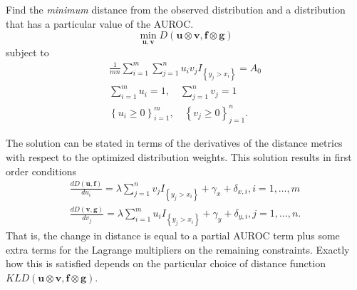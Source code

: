 
Find the \emph{minimum} distance from the observed distribution and a distribution that has a particular value of the AUROC.
%
\begin{equation}
    \min_{\mathbf{u}, \mathbf{v}}
        D(\mathbf{u} \otimes \mathbf{v}, \mathbf{f} \otimes \mathbf{g})
\end{equation}
%
\noindent subject to
%
\begin{align}
    \frac{1}{m n} \sum_{i = 1}^{m} \sum_{j = 1}^{n} u_i v_j I_{\left\{ y_j > x_i \right\}} = A_0 \\
    \sum_{i = 1}^{m} u_i = 1, \quad \sum_{j = 1}^{n} v_j = 1 \\
    \left\{ u_i  \geq 0 \right\}_{i=1}^{m}, \quad \left\{ v_j \geq 0 \right\}_{j=1}^{n}.
\end{align}
%









The solution can be stated in terms of the derivatives of the distance metrics with respect to the optimized distribution weights.
%
This solution results in first order conditions
\begin{align}
    \frac{d D(\mathbf{u},\mathbf{f})}{d u_i} = \lambda \sum_{j = 1}^{n} v_j I_{\left\{ y_j > x_i \right\}} + \gamma_x + \delta_{x,i},
    i = 1, \dots, m \\
    \frac{d D(\mathbf{v},\mathbf{g})}{d v_j} = \lambda \sum_{i = 1}^{m} u_i I_{\left\{ y_j > x_i \right\}} + \gamma_y + \delta_{y,i},
    j = 1, \dots, n.
\end{align}
%
That is, the change in distance is equal to a partial AUROC term plus some extra terms for the Lagrange multipliers on the remaining constraints. Exactly how this is satisfied depends on the particular choice of distance function $KLD(\mathbf{u} \otimes \mathbf{v}, \mathbf{f} \otimes \mathbf{g})$.





